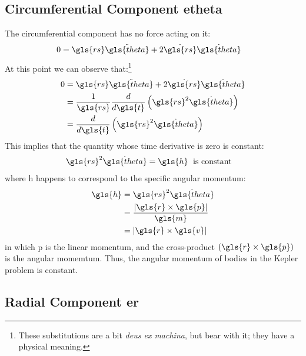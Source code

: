 \documentclass[12pt,openany]{book}
\begin{document}
\subsection{Circumferential Component \gls{etheta}}

The circumferential component has no force acting on it:
\begin{align}
  0 &=
  \gls{rs}\ddot{\gls{theta}} + 2\dot{\gls{rs}}\dot{\gls{theta}}
\end{align}
At this point we can observe that:\footnote{These substitutions are a bit \emph{deus ex machina}, but bear with it; they have a physical meaning.}
\begin{align}
  0
  &= \gls{rs}\ddot{\gls{theta}} + 2\dot{\gls{rs}}\dot{\gls{theta}} \\
  &= \frac{1}{\gls{rs}}
    \frac{d}{d\gls{t}}\left(\gls{rs}^2\dot{\gls{theta}}\right) \\
  &= \frac{d}{d\gls{t}}\left(\gls{rs}^2\dot{\gls{theta}}\right)
\end{align}
This implies that the quantity whose time derivative is zero is constant:
\begin{align}
  \gls{rs}^2\dot{\gls{theta}} &= \gls{h}\;\textrm{ is constant} \label{eq:constant-sam}
\end{align}
where \gls{h} happens to correspond to the specific angular momentum:
\begin{align}
  \gls{h} 
  &= \gls{rs}^2\dot{\gls{theta}} \\
  &= \frac{\left| \gls{r} \times \gls{p} \right|}{\gls{m}} \\
  &= \left| \gls{r} \times \gls{v} \right|
\end{align}
in which \gls{p} is the linear momentum, and the cross-product \((\gls{r}\times\gls{p})\) is the angular momemtum. Thus, the angular momentum of bodies in the Kepler problem is constant.

\subsection{Radial Component \gls{er}}
\end{document}
